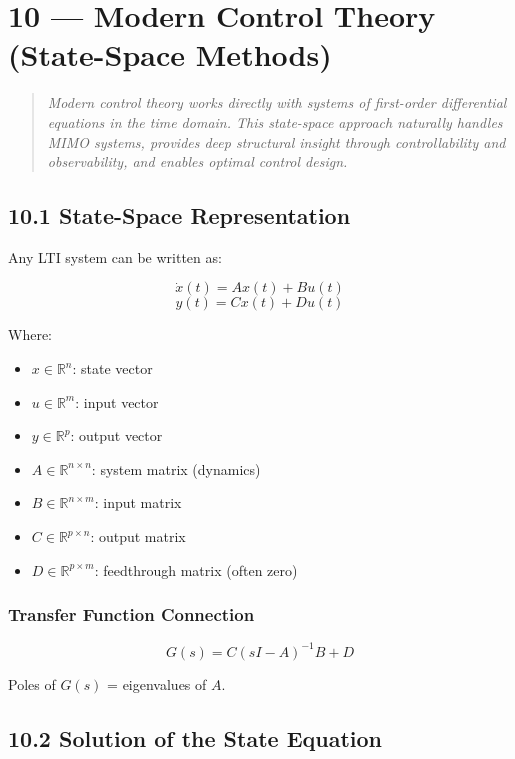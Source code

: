 \documentclass[11pt,a4paper]{book}
\begin{document}
\section{10 — Modern Control Theory (State-Space Methods)}

\begin{quote}
\textit{Modern control theory works directly with systems of first-order differential equations in the time domain. This state-space approach naturally handles MIMO systems, provides deep structural insight through controllability and observability, and enables optimal control design.}
\end{quote}

\medskip\noindent\hrulefill\medskip

\subsection{10.1 State-Space Representation}

Any LTI system can be written as:

\[\boxed{\dot{x}(t) = Ax(t) + Bu(t)}\]
\[\boxed{y(t) = Cx(t) + Du(t)}\]

Where:
\begin{itemize}
\item $x \in \mathbb{R}^n$: state vector
\item $u \in \mathbb{R}^m$: input vector
\item $y \in \mathbb{R}^p$: output vector
\item $A \in \mathbb{R}^{n \times n}$: system matrix (dynamics)
\item $B \in \mathbb{R}^{n \times m}$: input matrix
\item $C \in \mathbb{R}^{p \times n}$: output matrix
\item $D \in \mathbb{R}^{p \times m}$: feedthrough matrix (often zero)
\end{itemize}

\subsubsection{Transfer Function Connection}

\[G(s) = C(sI - A)^{-1}B + D\]

Poles of $G(s)$ = eigenvalues of $A$.

\medskip\noindent\hrulefill\medskip

\subsection{10.2 Solution of the State Equation}
\end{document}
